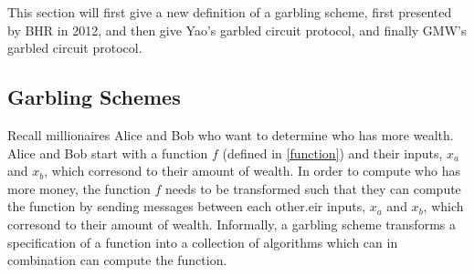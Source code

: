 \documentclass[12pt,twoside]{reedthesis}
\begin{document}
This section will first give a new definition of a garbling scheme, first presented by BHR in 2012, and then give Yao's garbled circuit protocol, and finally GMW's garbled circuit protocol.

\subsection{Garbling Schemes}
Recall millionaires Alice and Bob who want to determine who has more wealth.
Alice and Bob start with a function $f$ (defined in \ref{function}) and their inputs, $x_a$ and $x_b$, which corresond to their amount of wealth.
In order to compute who has more money, the function $f$ needs to be transformed such that they can compute the function by sending messages between each other.eir inputs, $x_a$ and $x_b$, which corresond to their amount of wealth.
Informally, a garbling scheme transforms a specification of a function into a collection of algorithms which can in combination can compute the function.
\end{document}
